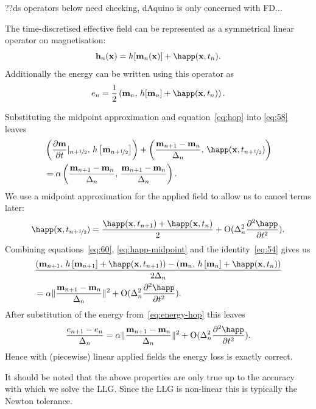 ??ds operators below need checking, dAquino is only concerned with FD...

The time-discretised effective field can be represented as a symmetrical linear operator on magnetisation:\cite{DAquino2005}
\begin{equation}
  \label{eq:hop}
  \hv_n(\xv) = \hop [\mv_n(\xv)] + \happ(\xv, t_n).
\end{equation}
Additionally the energy can be written using this operator as
\begin{equation}
  \label{eq:energy-hop}
  \e_n = \frac{1}{2} \ip{\mv_n}{\hop[\mv_n] + \happ(\xv,t_n)}.
\end{equation}

Substituting the midpoint approximation and equation~\eqref{eq:hop} into \eqref{eq:58} leaves
\begin{align}
  \label{eq:60}
  &\ip{ \pd{\mv}{t} \lvert_{n+\half}}{\hop \left[\mv_{n+\half} \right]} + \ip{\frac{\mv_{n+1} - \mv_n}{\dtn}}{\happ(\xv,t_{n+\half})} \\
  &= \dampc \ip{\frac{\mv_{n+1} - \mv_n}{\dtn}}{\frac{\mv_{n+1} - \mv_n}{\dtn}}.
\end{align}
We use a midpoint approximation for the applied field to allow us to cancel terms later:
\begin{equation}
  \label{eq:happ-midpoint}
  \happ(\xv,t_{n+\half}) = \frac{\happ(\xv, t_{n+1}) + \happ(\xv, t_n)}{2} + \order{\dtn^2 \spd{\happ}{t}}.
\end{equation}
Combining equations~\eqref{eq:60}, \eqref{eq:happ-midpoint} and the identity~\eqref{eq:54} gives us
\begin{align}
  &\frac{\ip{\mv_{n+1}}{\hop \left[\mv_{n+1} \right] + \happ(\xv, t_{n+1})}
    - \ip{\mv_{n}}{\hop \left[\mv_{n} \right] + \happ(\xv, t_n)}
    }{2\dtn} \notag\\
  &= \dampc \norm{\frac{\mv_{n+1} - \mv_n}{\dtn}}^2
  + \order{\dtn^2 \spd{\happ}{t}}.
\end{align}
After substitution of the energy from~\eqref{eq:energy-hop} this leaves
\begin{equation}
  \frac{\e_{n+1} - \e_n}{\dtn}
  = \dampc \norm{\frac{\mv_{n+1} - \mv_n}{\dtn}}^2
  + \order{\dtn^2 \spd{\happ}{t}}.
\end{equation}
Hence with (piecewise) linear applied fields the energy loss is exactly correct.

It should be noted that the above properties are only true up to the accuracy with which we solve the LLG. Since the LLG is non-linear this is typically the Newton tolerance.



